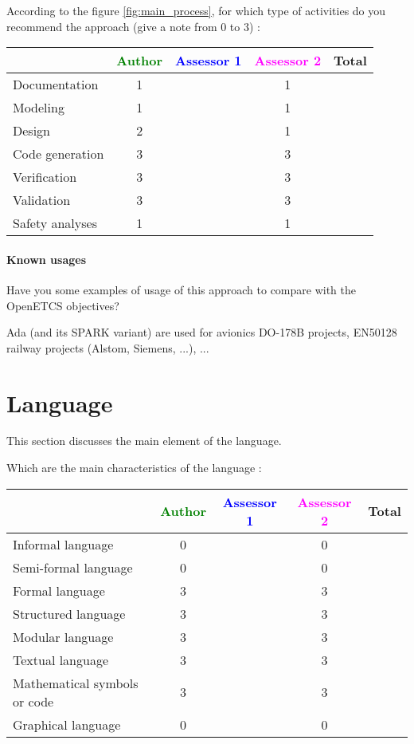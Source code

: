 According to the figure \ref{fig:main_process}, for which type of activities do you recommend the approach (give a note from 0 to  3) :

\begin{tabular}{|l | c | c | c | c|}
\hline
& \textcolor{green}{Author} & \textcolor{blue}{Assessor 1} & \textcolor{magenta}{Assessor 2} & Total \\
\hline 
Documentation & 1 & & 1 &  \\
\hline
Modeling & 1 & & 1 &  \\
\hline
Design & 2 & & 1 & \\
\hline
Code generation & 3 & & 3 & \\
\hline
Verification & 3 & & 3 & \\
\hline
Validation & 3 & & 3 & \\
\hline
Safety analyses & 1 & & 1 & \\
\hline
\end{tabular}

\paragraph{Known usages} Have you some examples of usage of this approach to  compare with the OpenETCS objectives?

Ada (and its SPARK variant) are used for avionics DO-178B
projects, EN50128 railway projects (Alstom, Siemens, ...), ...

\section{Language}
This section discusses the main element of the language.

Which are the main characteristics of the language :

\begin{tabular}{|l | c | c | c | c|}
\hline
& \textcolor{green}{Author} & \textcolor{blue}{Assessor 1} & \textcolor{magenta}{Assessor 2} & Total \\
\hline 
Informal language & 0 & & 0 &  \\
\hline 
Semi-formal language & 0 & & 0 &  \\
\hline
Formal language & 3 & & 3 &  \\
\hline
Structured language & 3 & & 3 & \\
\hline
Modular language & 3 & & 3 & \\
\hline
Textual language & 3 & & 3 & \\
\hline
Mathematical symbols or code & 3 & & 3 & \\
\hline
Graphical language & 0 & & 0 & \\
\hline
\end{tabular}


